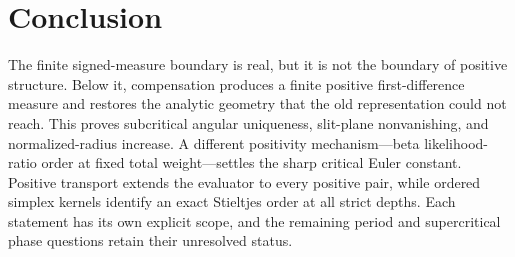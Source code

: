 \documentclass[11pt]{article}
\numberwithin{equation}{section}
\theoremstyle{definition}
\theoremstyle{remark}
\begin{document}
\section*{Conclusion}
The finite signed-measure boundary is real, but it is not the boundary
of positive structure. Below it, compensation produces a finite positive
first-difference measure and restores the analytic geometry that the old
representation could not reach. This proves subcritical angular
uniqueness, slit-plane nonvanishing, and normalized-radius increase.
A different positivity mechanism---beta likelihood-ratio order at fixed
total weight---settles the sharp critical Euler constant. Positive
transport extends the evaluator to every positive pair, while ordered
simplex kernels identify an exact Stieltjes order at all strict depths.
Each statement has its own explicit scope, and the remaining period and
supercritical phase questions retain their unresolved status.
\end{document}
